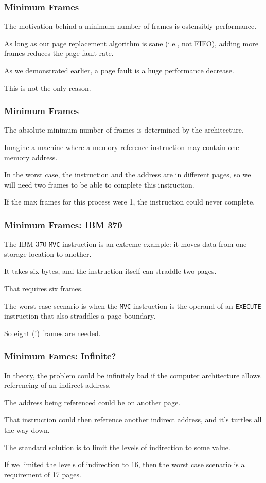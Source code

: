 \begin{frame}
\frametitle{Minimum Frames}

The motivation behind a minimum number of frames is ostensibly performance. 

As long as our page replacement algorithm is sane (i.e., not FIFO), adding more frames reduces the page fault rate. 

As we demonstrated earlier, a page fault is a huge performance decrease. 

This is not the only reason.

\end{frame}

\begin{frame}
\frametitle{Minimum Frames}

The absolute minimum number of frames is determined by the architecture. 

Imagine a machine where a memory reference instruction may contain one memory address.

In the worst case, the instruction and the address are in different pages, so we will need two frames to be able to complete this instruction.

If the max frames for this process were 1, the instruction could never complete.

\end{frame}

\begin{frame}
\frametitle{Minimum Frames: IBM 370}

The IBM 370 \texttt{MVC} instruction is an extreme example: it moves data from one storage location to another. 

It takes six bytes, and the instruction itself can straddle two pages. 

That requires six frames. 

The worst case scenario is when the \texttt{MVC} instruction is the operand of an \texttt{EXECUTE} instruction that also straddles a page boundary. 

So eight (!) frames are needed.


\end{frame}

\begin{frame}
\frametitle{Minimum Fames: Infinite?}

In theory, the problem could be infinitely bad if the computer architecture allows referencing of an indirect address. 

The address being referenced could be on another page. 

That instruction could then reference another indirect address, and it's turtles all the way down.

The standard solution is to limit the levels of indirection to some value.

If we limited the levels of indirection to 16, then the worst case scenario is a requirement of 17 pages.

\end{frame}

